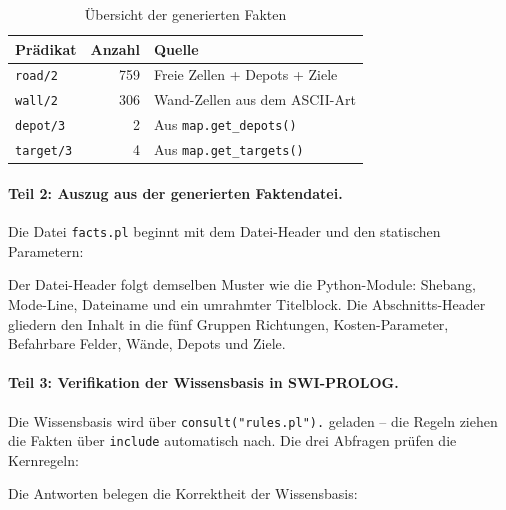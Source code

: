 \begin{table}[H]
    \centering
    \begin{tabular}{l r l}
        \toprule
        \textbf{Prädikat} & \textbf{Anzahl} & \textbf{Quelle} \\
        \midrule
        \texttt{road/2}   & 759 & Freie Zellen + Depots + Ziele \\
        \texttt{wall/2}   & 306 & Wand-Zellen aus dem \acs{ASCII}-Art \\
        \texttt{depot/3}  & 2   & Aus \texttt{map.get\_depots()} \\
        \texttt{target/3} & 4   & Aus \texttt{map.get\_targets()} \\
        \bottomrule
    \end{tabular}
    \caption{Übersicht der generierten Fakten}
    \label{tab:prolog_4a_facts}
\end{table}

\paragraph{Teil 2: Auszug aus der generierten Faktendatei.}
Die Datei \texttt{facts.pl} beginnt mit dem Datei-Header und den statischen Parametern:



Der Datei-Header folgt demselben Muster wie die Python-Module: Shebang, Mode-Line, Dateiname und ein umrahmter Titelblock. Die Abschnitts-Header gliedern den Inhalt in die fünf Gruppen Richtungen, Kosten-Parameter, Befahrbare Felder, Wände, Depots und Ziele.

\paragraph{Teil 3: Verifikation der Wissensbasis in \acs{SWI}-\acs{PROLOG}.}
Die Wissensbasis wird über \texttt{consult("rules.pl").} geladen -- die Regeln ziehen die Fakten über \texttt{include} automatisch nach. Die drei Abfragen prüfen die Kernregeln:



Die Antworten belegen die Korrektheit der Wissensbasis:

